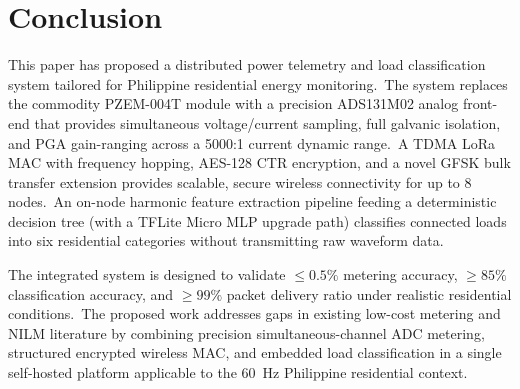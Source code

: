 \documentclass[conference]{IEEEtran}
\begin{document}
\section{Conclusion}
\label{sec:conclusion}

This paper has proposed a distributed power telemetry and load
classification system tailored for Philippine residential energy
monitoring.\ The system replaces the commodity PZEM-004T module with
a precision ADS131M02 analog front-end that provides simultaneous
voltage/current sampling, full galvanic isolation, and PGA
gain-ranging across a 5000:1 current dynamic range.\ A TDMA LoRa MAC
with frequency hopping, AES-128 CTR encryption, and a novel GFSK
bulk transfer extension provides scalable, secure wireless
connectivity for up to 8 nodes.\ An on-node harmonic feature
extraction pipeline feeding a deterministic decision tree (with a
TFLite Micro MLP upgrade path) classifies connected loads into six
residential categories without transmitting raw waveform data.

The integrated system is designed to validate \(\le 0.5\%\) metering
accuracy, \(\ge 85\%\) classification accuracy, and \(\ge 99\%\)
packet delivery ratio under realistic residential conditions.\ The
proposed work addresses gaps in existing low-cost metering and NILM
literature by combining precision simultaneous-channel ADC metering,
structured encrypted wireless MAC, and embedded load classification in
a single self-hosted platform applicable to the 60~Hz Philippine
residential context.
\end{document}
